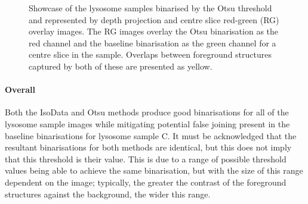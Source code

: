 \begin{figure}[h!]
	
	\caption[Showcase of the lysosome samples binarised by the Otsu threshold and represented by depth projection and red-green overlay images.]{Showcase of the lysosome samples binarised by the Otsu threshold and represented by depth projection and centre slice red-green (RG) overlay images. The RG images overlay the Otsu binarisation as the red channel and the baseline binarisation as the green channel for a centre slice in the sample. Overlaps between foreground structures captured by both of these are presented as yellow.}
	\label{fig:lyso_moments}
\end{figure}

\paragraph{Overall}
Both the IsoData and Otsu methods produce good binarisations for all of the lysosome sample images while mitigating potential false joining present in the baseline binarisations for lysosome sample C. It must be acknowledged that the resultant binarisations for both methods are identical, but this does not imply that this threshold is their value. This is due to a range of possible threshold values being able to achieve the same binarisation, but with the size of this range dependent on the image; typically, the greater the contrast of the foreground structures against the background, the wider this range.  
\clearpage
